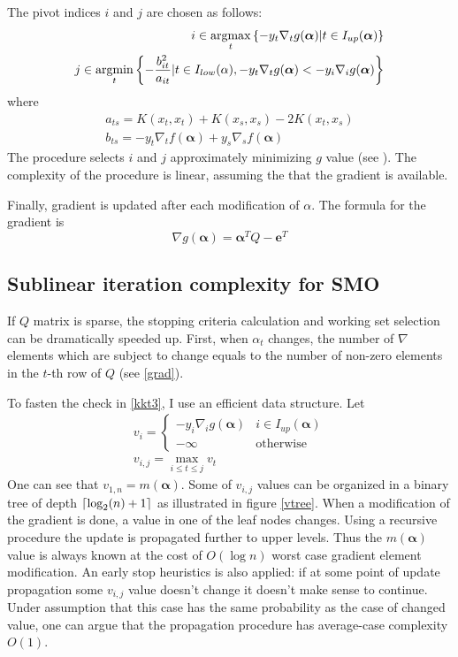 The pivot indices $i$ and $j$ are chosen as follows:
\begin{eqnarray}
i \in \underset{t}{\operatorname{argmax}}
\left\{ -y_t \nabla_t g(\bm{\alpha}) | t \in I_{up}(\bm{\alpha}) \right\} \label{idef}\\
j \in \underset{t}{\operatorname{argmin}}
\left\{
-\frac{b_{it}^2}{a_{it}}| t \in I_{low} (\alpha), 
-y_t \nabla_t g(\bm{\alpha}) < -y_i \nabla_i g(\bm{\alpha})
\right\} \label{jdef}
\end{eqnarray}
where
\begin{eqnarray}
a_{ts} = K(x_t, x_t) + K(x_s, x_s) - 2 K(x_t, x_s) \\ 
b_{ts} = -y_t \nabla_t f(\bm{\alpha}) + y_s \nabla_s f(\bm{\alpha})
\end{eqnarray}
The procedure selects $i$ and $j$ approximately minimizing $g$ value (see \cite{chang2011libsvm}). The complexity of the procedure is linear, assuming the that the gradient is available.

Finally, gradient is updated after each modification of $\alpha$. The formula for the gradient is
\begin{equation}
\nabla g(\bm{\alpha}) = \bm{\alpha}^T Q - \bm{e}^T
\label{grad}
\end{equation}

\subsection{Sublinear iteration complexity for SMO}
If $Q$ matrix is sparse, the stopping criteria calculation and working set selection can be dramatically speeded up. First, when $\alpha_t$ changes, the number of $\nabla$ elements which are subject to change equals to the number of non-zero elements in the $t$-th row of $Q$ (see \ref{grad}). 

To fasten the check in \ref{kkt3}, I use an efficient data structure. Let 
\begin{eqnarray}
v_i=\begin{cases}
-y_i \nabla_i g(\bm{\alpha}) & i \in I_{up}(\bm{\alpha}) \\
-\infty & \textrm{otherwise}
\end{cases} \\
v_{i,j} = \max\limits_{i \leq t \leq j} v_t
\end{eqnarray}
One can see that $v_{1,n}=m(\bm{\alpha})$. Some of $v_{i,j}$ values can be organized in a binary tree of depth $\lceil \log_2(n) + 1 \rceil$ as illustrated in figure \ref{vtree}. When a modification of the gradient is done, a value in one of the leaf nodes changes. Using a recursive procedure the update is propagated further to upper levels. Thus the $m(\bm{\alpha})$ value is always known at the cost of $O(\log n)$ worst case gradient element modification. An early stop heuristics is also applied: if at some point of update propagation some $v_{i,j}$ value doesn't change it doesn't make sense to continue. Under assumption that this case has the same probability as the case of changed value, one can argue that the propagation procedure has average-case complexity $O(1)$.

